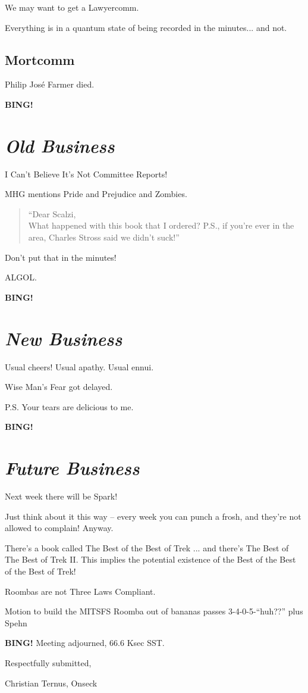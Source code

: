 \documentclass[10pt]{article}
\newcommand{\bing}{{\bf BING!} }
\newcommand{\goto}[1]{\bing \vskip 12pt \section*{{\em{#1}}}}
\newcommand{\ps}{ plus Spehn\xspace}
\begin{document}
We may want to get a Lawyercomm.

Everything is in a quantum state of being recorded in the
minutes... and not.

\subsection*{Mortcomm}

Philip Jos\'e Farmer died. 

\goto{Old Business}

I Can't Believe It's Not Committee Reports!\texttrademark

MHG mentions Pride and Prejudice and Zombies.

\begin{quote}
  ``Dear Scalzi,\\
  What happened with this book that I ordered?  P.S., if you're ever
  in the area, Charles Stross said we didn't suck!''
\end{quote}

Don't put that in the minutes!

ALGOL.

\goto{New Business}

Usual cheers!  Usual apathy.  Usual ennui.

Wise Man's Fear got delayed.

P.S. Your tears are delicious to me.

\goto{Future Business}

Next week there will be Spark!

Just think about it this way -- every week you can punch a frosh, and
they're not allowed to complain!  Anyway.

There's a book called The Best of the Best of Trek ... and there's The
Best of The Best of Trek II.  This implies the potential existence of
the Best of the Best of the Best of Trek!

Roombas are not Three Laws Compliant.

Motion to build the MITSFS Roomba out of bananas passes 3-4-0-5-``huh??''\ps

\bing
\noindent
Meeting adjourned, 66.6 Ksec SST.

\vspace{18pt}

\centerline{Respectfully submitted,}
\centerline{Christian Ternus, Onseck}
\end{document}
